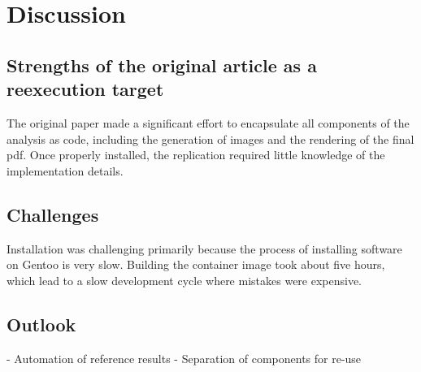 \section{Discussion}

\subsection{Strengths of the original article as a reexecution target}
The original paper made a significant effort to encapsulate all
components of the analysis as code, including the generation of images
and the rendering of the final pdf. Once properly installed, the
replication required little knowledge of the implementation details.

\subsection{Challenges}

Installation was challenging primarily because the process of installing
software on Gentoo is very slow. Building the container image took
about five hours, which lead to a slow development cycle where mistakes
were expensive.

\subsection{Outlook}

- Automation of reference results 
- Separation of components for re-use
